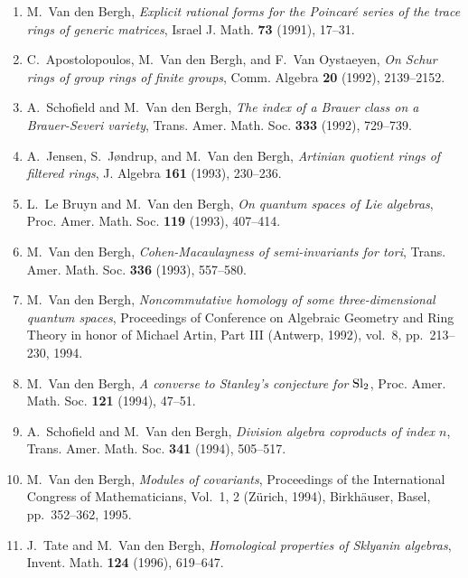 \begin{enumerate}
\item
M.~Van den Bergh, {\em Explicit rational forms for the Poincar\'e series of the trace rings of generic matrices}, Israel J. Math. {\bf 73} (1991), 17--31.

\item
C.~Apostolopoulos, M.~Van den Bergh, and F.~Van Oystaeyen, {\em On Schur rings of group rings of finite groups}, Comm. Algebra {\bf 20} (1992), 2139--2152.

\item
A.~Schofield and M.~Van den Bergh, {\em The index of a Brauer class on a Brauer-Severi variety}, Trans. Amer. Math. Soc. {\bf 333} (1992), 729--739.

\item
A.~Jensen, S.~J{\o}ndrup, and M.~Van den Bergh, {\em Artinian quotient rings of filtered rings}, J. Algebra {\bf 161} (1993), 230--236.

\item
L.~Le Bruyn and M.~Van den Bergh, {\em On quantum spaces of Lie algebras}, Proc. Amer. Math. Soc. {\bf 119} (1993), 407--414.

\item
M.~Van den Bergh, {\em Cohen-Macaulayness of semi-invariants for tori}, Trans. Amer. Math. Soc. {\bf 336} (1993), 557--580.

\item
M.~Van den Bergh, {\em Noncommutative homology of some three-dimensional quantum spaces}, Proceedings of Conference on Algebraic Geometry and Ring Theory in honor of Michael Artin, Part III (Antwerp, 1992), vol.~8, pp.~213--230, 1994.

\item
M.~Van den Bergh, {\em A converse to Stanley's conjecture for $\rm {S}l\sb 2$}, Proc. Amer. Math. Soc. {\bf 121} (1994), 47--51.

\item
A.~Schofield and M.~Van den Bergh, {\em Division algebra coproducts of index $n$}, Trans. Amer. Math. Soc. {\bf 341} (1994), 505--517.

\item
M.~Van den Bergh, {\em Modules of covariants}, Proceedings of the International Congress of Mathematicians, Vol.\ 1, 2 (Z\"urich, 1994), Birkh\"auser, Basel, pp.~352--362, 1995.

\item
J.~Tate and M.~Van den Bergh, {\em Homological properties of Sklyanin algebras}, Invent. Math. {\bf 124} (1996), 619--647.


\end{enumerate}
